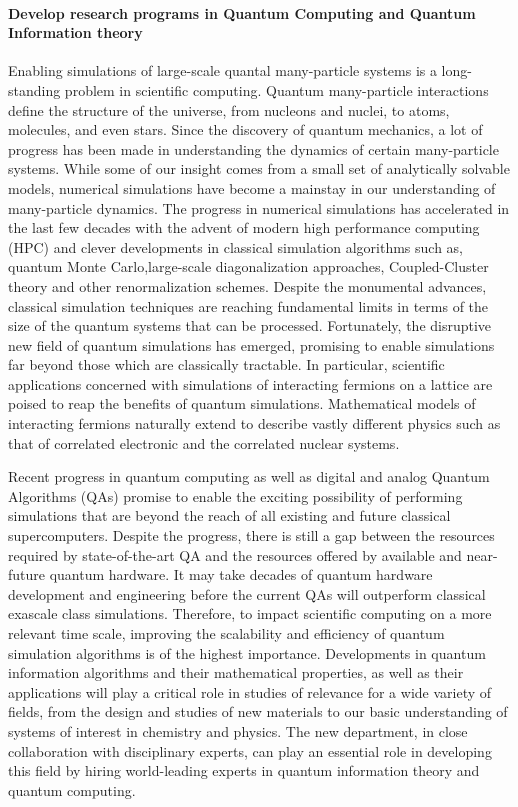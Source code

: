 \documentclass[]{article}
\let\oldparagraph\paragraph
\renewcommand{\paragraph}[1]{\oldparagraph{#1}\mbox{}}
\begin{document}
\hypertarget{develop-research-programs-in-quantum-computing-and-quantum-information-theory}{%
\paragraph{Develop research programs in Quantum Computing and Quantum
Information
theory}\label{develop-research-programs-in-quantum-computing-and-quantum-information-theory}}

Enabling simulations of large-scale quantal many-particle systems is a
long-standing problem in scientific computing. Quantum many-particle
interactions define the structure of the universe, from nucleons and
nuclei, to atoms, molecules, and even stars. Since the discovery of
quantum mechanics, a lot of progress has been made in understanding the
dynamics of certain many-particle systems. While some of our insight
comes from a small set of analytically solvable models, numerical
simulations have become a mainstay in our understanding of many-particle
dynamics. The progress in numerical simulations has accelerated in the
last few decades with the advent of modern high performance computing
(HPC) and clever developments in classical simulation algorithms such
as, quantum Monte Carlo,large-scale diagonalization approaches,
Coupled-Cluster theory and other renormalization schemes. Despite the
monumental advances, classical simulation techniques are reaching
fundamental limits in terms of the size of the quantum systems that can
be processed. Fortunately, the disruptive new field of quantum
simulations has emerged, promising to enable simulations far beyond
those which are classically tractable. In particular, scientific
applications concerned with simulations of interacting fermions on a
lattice are poised to reap the benefits of quantum simulations.
Mathematical models of interacting fermions naturally extend to describe
vastly different physics such as that of correlated electronic and the
correlated nuclear systems.

Recent progress in quantum computing as well as digital and analog
Quantum Algorithms (QAs) promise to enable the exciting possibility of
performing simulations that are beyond the reach of all existing and
future classical supercomputers. Despite the progress, there is still a
gap between the resources required by state-of-the-art QA and the
resources offered by available and near-future quantum hardware. It may
take decades of quantum hardware development and engineering before the
current QAs will outperform classical exascale class simulations.
Therefore, to impact scientific computing on a more relevant time scale,
improving the scalability and efficiency of quantum simulation
algorithms is of the highest importance. Developments in quantum
information algorithms and their mathematical properties, as well as
their applications will play a critical role in studies of relevance for
a wide variety of fields, from the design and studies of new materials
to our basic understanding of systems of interest in chemistry and
physics. The new department, in close collaboration with disciplinary
experts, can play an essential role in developing this field by hiring
world-leading experts in quantum information theory and quantum
computing.
\end{document}
